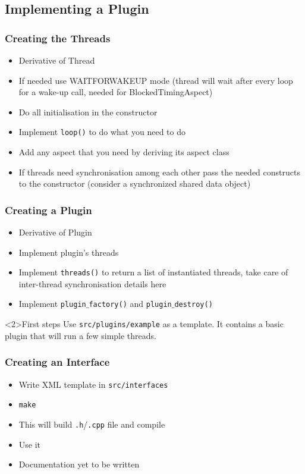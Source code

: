\subsection{Implementing a Plugin}
\begin{frame}
  \frametitle{Creating the Threads}
  \begin{itemize}
  \item Derivative of Thread
  \item If needed use WAITFORWAKEUP mode (thread will wait after every loop for a
    wake-up call, needed for BlockedTimingAspect)
  \item Do all initialisation in the constructor
  \item Implement \texttt{loop()} to do what you need to do
  \item Add any aspect that you need by deriving its aspect class
  \item If threads need synchronisation among each other pass the needed constructs
    to the constructor (consider a synchronized shared data object)
  \end{itemize}
\end{frame}

\begin{frame}
  \frametitle{Creating a Plugin}
  \begin{itemize}
  \item Derivative of Plugin
  \item Implement plugin's threads
  \item Implement \texttt{threads()} to return a list of instantiated
    threads, take care of inter-thread synchronisation details here
  \item Implement \texttt{plugin$\_$factory()} and \texttt{plugin$\_$destroy()}
  \end{itemize}
  \begin{block}<2>{First steps}
    Use \texttt{src/plugins/example} as a template. It contains a basic plugin
    that will run a few simple threads.
  \end{block}
\end{frame}

\begin{frame}
  \frametitle{Creating an Interface}
  \begin{itemize}
  \item Write XML template in \texttt{src/interfaces}
  \item \texttt{make}
  \item This will build \texttt{.h}/\texttt{.cpp} file and compile
  \item Use it
  \item Documentation yet to be written
  \end{itemize}
\end{frame}

